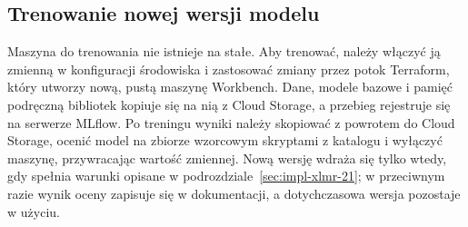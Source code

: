 \subsection{Trenowanie nowej wersji modelu}
\label{sec:guide-training}

Maszyna do trenowania nie istnieje na stałe.
Aby trenować, należy włączyć ją zmienną w konfiguracji środowiska i zastosować zmiany przez potok Terraform, który utworzy nową, pustą maszynę Workbench.
Dane, modele bazowe i pamięć podręczną bibliotek kopiuje się na nią z Cloud Storage, a przebieg rejestruje się na serwerze MLflow.
Po treningu wyniki należy skopiować z powrotem do Cloud Storage, ocenić model na zbiorze wzorcowym skryptami z katalogu  i wyłączyć maszynę, przywracając wartość zmiennej.
Nową wersję wdraża się tylko wtedy, gdy spełnia warunki opisane w podrozdziale~\ref{sec:impl-xlmr-21}; w przeciwnym razie wynik oceny zapisuje się w dokumentacji, a dotychczasowa wersja pozostaje w użyciu.
